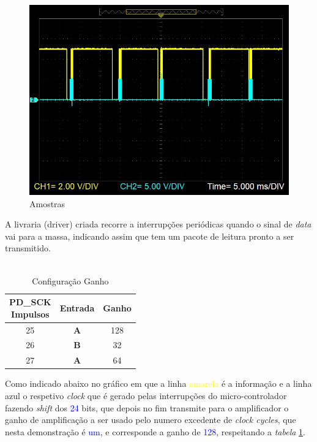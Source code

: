 \begin{figure}[H]
	\centering
	\includegraphics[scale=0.55]{./image/PESTA/graph/80SPS64GAIN/SPS_80.JPG}
	\caption{Amostras}
	\label{SPS_64}
\end{figure}
A livraria (driver) criada recorre a interrupções periódicas quando o sinal de \textit{data} vai para a massa, indicando assim que tem um pacote de leitura pronto a ser transmitido.\\
\\
\begin{minipage}[!b]{.40\linewidth}
	\begin{table}[H]
		\captionsetup{justification=raggedright,singlelinecheck=false}
		\begin{tabular}{ | c | c | c |  }
			\hline
			\makecell[c]{PD\_SCK \\ Impulsos} & Entrada  & Ganho \\
			\hline
			\hline
			25 & \textbf{A} & 128 \\
			\hline
			26 & \textbf{B} & 32 \\
			\hline
			27 & \textbf{A} & 64 \\
			\hline
		\end{tabular}	
		\caption{Configuração Ganho}
		\label{Gain_Selection}
	\end{table}
	\vfill
\end{minipage}
\begin{minipage}[l]{.6\linewidth}
\vspace{.3cm}
Como indicado abaixo no gráfico em que a linha \textcolor{yellow}{amarela} é a informação e a linha \textcolor{BlueGreen}{azul} o respetivo \textit{clock} que é gerado pelas interrupções do micro-controlador fazendo \textit{shift} dos \textcolor{blue}{24} bits, que depois no fim transmite para o amplificador o ganho de amplificação a ser usado pelo numero excedente de \textit{clock cycles}, que nesta demonstração é \textcolor{blue}{um}, e corresponde a ganho de \textcolor{blue}{128}, respeitando a \textit{tabela} \ref{Gain_Selection}.
\end{minipage}\\
